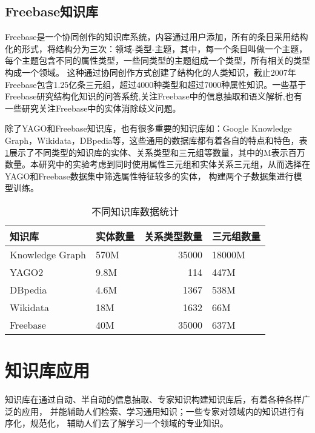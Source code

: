 \subsection{Freebase知识库}
Freebase\cite{Bollacker2008FreebaseAC}是一个协同创作的知识库系统，内容通过用户添加，所有的条目采用结构化的形式，将结构分为三次：领域-类型-主题，其中，每一个条目叫做一个主题，每个主题包含不同的属性类型，一些同类型的主题组成一个类型，所有相关的类型构成一个领域。
这种通过协同创作方式创建了结构化的人类知识，截止2007年Freebase包含1.25亿条三元组，超过4000种类型和超过7000种属性知识。一些基于Freebase研究结构化知识的问答系统\cite{Yao2014InformationEO}\cite{Yao2015LeanQA},关注Freebase中的信息抽取和语义解析\cite{Yao2014FreebaseQI},也有一些研究关注Freebase中的实体消除歧义问题\cite{Zheng2012EntityDW}。

除了YAGO和Freebase知识库，也有很多重要的知识库如：Google Knowledge Graph，Wikidata，DBpedia等，这些通用的数据库都有着各自的特点和特色，表\ref{tab:addlabel-kb-list}展示了不同类型的知识库的实体、关系类型和三元组等数量，其中的M表示百万数量。本研究中的实验考虑到同时使用属性三元组和实体关系三元组，从而选择在YAGO和Freebase数据集中筛选属性特征较多的实体，
构建两个子数据集进行模型训练。

\begin{table}[htbp]
  \centering
  \caption{不同知识库数据统计}
    \begin{tabular}{|l|l|r|l|}
    \hline
    知识库   & 实体数量  & \multicolumn{1}{l|}{关系类型数量} & 三元组数量 \\
    \hline
    Knowledge Graph & 570M  & 35000 & 18000M \\
    \hline
    YAGO2 & 9.8M  & 114   & 447M \\
    \hline
    DBpedia & 4.6M  & 1367  & 538M \\
    \hline
    Wikidata & 18M   & 1632  & 66M \\
    \hline
    Freebase & 40M   & 35000 & 637M \\
    \hline
    \end{tabular}%
  \label{tab:addlabel-kb-list}%
\end{table}%


\section{知识库应用}
知识库在通过自动、半自动的信息抽取、专家知识构建知识库后，有着各种各样广泛的应用，
并能辅助人们检索、学习通用知识；一些专家对领域内的知识进行有序化，规范化，
辅助人们去了解学习一个领域的专业知识。

